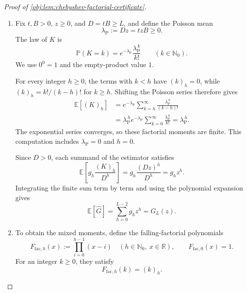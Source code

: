 \documentclass[11pt]{article}
\begin{document}
\begin{proof}[Proof of \cref{obj:lem:chebyshev-factorial-certificate}]
\begin{enumerate}
\item Fix \(t,B>0\), \(z\ge0\), and \(D=tB\ge L\), and define the Poisson mean
\[
\lambda_{\mathrm P}:=Dz=tzB\ge0.
\]
The law of \(K\) is
\[
\mathbb P(K=k)=e^{-\lambda_{\mathrm P}}
              \frac{\lambda_{\mathrm P}^{\,k}}{k!}
\qquad(k\in\mathbb N_0).
\]
We use \(0^0=1\) and the empty-product value \(1\).

For every integer \(h\ge0\), the terms with \(k<h\) have \((k)_h=0\), while \((k)_h=k!/(k-h)!\) for \(k\ge h\). Shifting the Poisson series therefore gives
\[
\begin{aligned}
\mathbb E[(K)_h]
 &=e^{-\lambda_{\mathrm P}}
   \sum_{k=h}^{\infty}
   \frac{\lambda_{\mathrm P}^{\,k}}{(k-h)!}\\
 &=\lambda_{\mathrm P}^{\,h}e^{-\lambda_{\mathrm P}}
   \sum_{k=0}^{\infty}\frac{\lambda_{\mathrm P}^{\,k}}{k!}
 =\lambda_{\mathrm P}^{\,h}.
\end{aligned}
\]
The exponential series converges, so these factorial moments are finite. This computation includes \(\lambda_{\mathrm P}=0\) and \(h=0\).

Since \(D>0\), each summand of the estimator satisfies
\[
\mathbb E\!\left[g_h\frac{(K)_h}{D^h}\right]
 =g_h\frac{(Dz)^h}{D^h}
 =g_hz^h.
\]
Integrating the finite sum term by term and using the polynomial expansion gives
\[
\mathbb E[\widehat G]
 =\sum_{h=0}^{L-2}g_hz^h
 =G_L(z).
\]

\item To obtain the mixed moments, define the falling-factorial polynomials
\[
F_{\mathrm{fac},h}(x):=\prod_{i=0}^{h-1}(x-i)
\quad(h\in\mathbb N_0,\ x\in\mathbb R),
\qquad F_{\mathrm{fac},0}(x)=1.
\]
For an integer \(k\ge0\), they satisfy
\[
F_{\mathrm{fac},h}(k)=(k)_h.
\]


\end{enumerate}
\end{proof}
\end{document}
